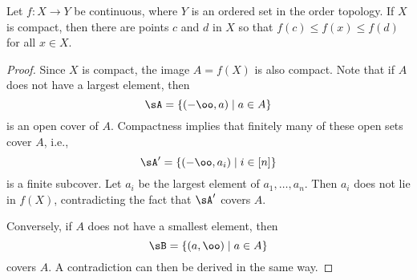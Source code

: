 \documentclass{amsart}
\begin{document}
\begin{thm}
  Let $f : X \to Y$ be continuous, where $Y$ is an ordered set in the order topology.
  If $X$ is compact, then there are points $c$ and $d$ in $X$ so that $f(c) \leq f(x) \leq f(d)$ for all $x \in X$.
\end{thm}
\begin{proof}
  Since $X$ is compact, the image $A = f(X)$ is also compact.
  Note that if $A$ does not have a largest element, then
  \[
    \sA = \{(-\oo,a) \mid a \in A\}
  \]
  is an open cover of $A$.
  Compactness implies that finitely many of these open sets cover $A$, i.e.,
  \[
    \sA' = \{(-\oo,a_{i}) \mid i \in [n]\}
  \]
  is a finite subcover.
  Let $a_{i}$ be the largest element of $a_{1},\ldots,a_{n}$.
  Then $a_{i}$ does not lie in $f(X)$, contradicting the fact that $\sA'$ covers $A$.

  Conversely, if $A$ does not have a smallest element, then
  \[
    \sB = \{(a,\oo) \mid a \in A\}
  \]
  covers $A$.
  A contradiction can then be derived in the same way.
\end{proof}
\end{document}
